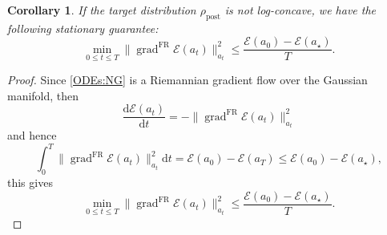 \documentclass[11pt]{article}
\theoremstyle{plain}
\newtheorem{corollary}[theorem]{Corollary}
\theoremstyle{definition}
\theoremstyle{remark}
\newcommand{\grad}{\operatorname{grad}}
\newcommand{\dd}{\mathrm{d}}
\begin{document}
\begin{corollary}
    If the target distribution $\rho_\mathrm{post}$ is not log-concave, we have the following stationary guarantee:
    \begin{equation*}
        \min_{0 \le t \le T} \| \grad^\mathrm{FR} \mathcal{E} (a_t) \|_{a_t}^2 \le \frac{\mathcal{E} (a_0) - \mathcal{E} (a_\star)}{T}.
    \end{equation*}
\end{corollary}

\begin{proof}
    Since \eqref{ODEs:NG} is a Riemannian gradient flow over the Gaussian manifold, then
    \begin{equation*}
        \frac{\dd \mathcal{E} (a_t)}{\dd t} = - \| \grad^\mathrm{FR} \mathcal{E} (a_t) \|_{a_t}^2
    \end{equation*}
    and hence
    \begin{equation*}
        \int_0^T \| \grad^\mathrm{FR} \mathcal{E} (a_t) \|_{a_t}^2 \dd t = \mathcal{E} (a_0) - \mathcal{E} (a_T) \leq \mathcal{E} (a_0) - \mathcal{E} (a_\star),
    \end{equation*}
    this gives
    \begin{equation*}
        \min_{0 \le t \le T} \| \grad^\mathrm{FR} \mathcal{E} (a_t) \|_{a_t}^2 \le \frac{\mathcal{E} (a_0) - \mathcal{E} (a_\star)}{T}.
    \end{equation*}
\end{proof}
\end{document}
